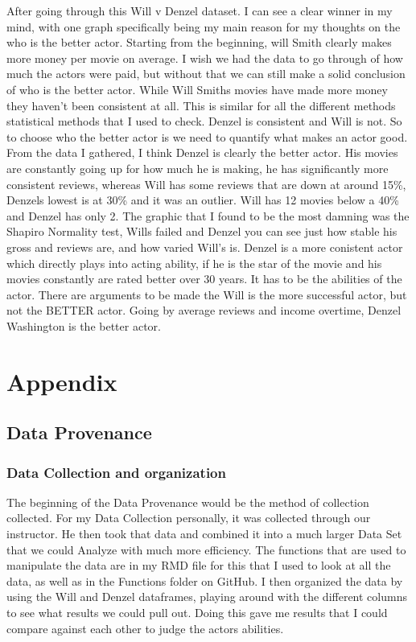 \documentclass[]{article}
\begin{document}
After going through this Will v Denzel dataset. I can see a clear winner
in my mind, with one graph specifically being my main reason for my
thoughts on the who is the better actor. Starting from the beginning,
will Smith clearly makes more money per movie on average. I wish we had
the data to go through of how much the actors were paid, but without
that we can still make a solid conclusion of who is the better actor.
While Will Smiths movies have made more money they haven't been
consistent at all. This is similar for all the different methods
statistical methods that I used to check. Denzel is consistent and Will
is not. So to choose who the better actor is we need to quantify what
makes an actor good. From the data I gathered, I think Denzel is clearly
the better actor. His movies are constantly going up for how much he is
making, he has significantly more consistent reviews, whereas Will has
some reviews that are down at around 15\%, Denzels lowest is at 30\% and
it was an outlier. Will has 12 movies below a 40\% and Denzel has only
2. The graphic that I found to be the most damning was the Shapiro
Normality test, Wills failed and Denzel you can see just how stable his
gross and reviews are, and how varied Will's is. Denzel is a more
conistent actor which directly plays into acting ability, if he is the
star of the movie and his movies constantly are rated better over 30
years. It has to be the abilities of the actor. There are arguments to
be made the Will is the more successful actor, but not the BETTER actor.
Going by average reviews and income overtime, Denzel Washington is the
better actor. \label{sec:conclusion}

\section{Appendix}
\subsection{Data Provenance}
\subsubsection{Data Collection and organization}

The beginning of the Data Provenance would be the method of collection
collected. For my Data Collection personally, it was collected through
our instructor. He then took that data and combined it into a much
larger Data Set that we could Analyze with much more efficiency. The
functions that are used to manipulate the data are in my RMD file for
this that I used to look at all the data, as well as in the Functions
folder on GitHub. I then organized the data by using the Will and Denzel
dataframes, playing around with the different columns to see what
results we could pull out. Doing this gave me results that I could
compare against each other to judge the actors abilities.
\end{document}
